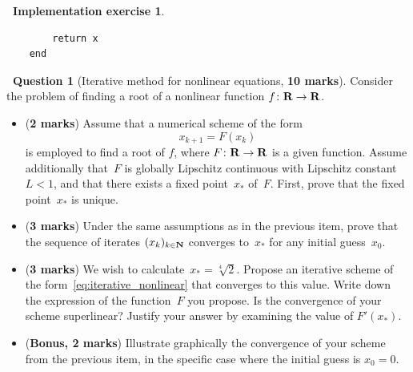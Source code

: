 \documentclass[10pt]{article}
\theoremstyle{definition}
\newtheorem{question}{{\normalfont \faGears}~Question}
\newtheorem{compexercise}{{\normalfont \faLaptop}~Implementation exercise}
\renewcommand{\mymarks}[1]{\textbf{#1 marks}}
\begin{document}
\begin{compexercise}
\begin{itemize}
\begin{verbatim}
        return x
    end
            \end{verbatim}
    \end{itemize}
\end{compexercise}

\newpage
\begin{question}
    [Iterative method for nonlinear equations, \textbf{10 marks}]
    Consider the problem of finding a root of a nonlinear function $f \colon \mathbf R \to \mathbf R$.
    \begin{itemize}
        \item (\mymarks{2})
            Assume that a numerical scheme of the form
            \begin{equation}
                \label{eq:iterative_nonlinear}
                x_{k+1} = F(x_k)
            \end{equation}
            is employed to find a root of $f$,
            where $F \colon \mathbf R \to \mathbf R$ is a given function.
            Assume additionally that~$F$ is globally Lipschitz continuous with Lipschitz constant~$L < 1$,
            and that there exists a fixed point~$x_*$ of~$F$.
            First, prove that the fixed point~$x_*$ is unique.
            \vspace{6cm}

        \item
            (\mymarks{3})
            Under the same assumptions as in the previous item,
            prove that the sequence of iterates $(x_k)_{k \in \mathbf N}$ converges to~$x_*$ for any initial guess~$x_0$.
            \vspace{6cm}

        \newpage
        \item
            (\mymarks{3})
            We wish to calculate~$x_* = \sqrt[4]{2}$.
            Propose an iterative scheme of the form~\eqref{eq:iterative_nonlinear} that converges to this value.
            Write down the expression of the function~$F$ you propose.
            Is the convergence of your scheme superlinear? Justify your answer by examining the value of $F'(x_*)$.
            \vspace{6cm}

        \item
            (\textbf{Bonus, 2 marks})
            Illustrate graphically the convergence of your scheme from the previous item,
            in the specific case where the initial guess is $x_0 = 0$.
    \end{itemize}
\end{question}
\end{document}
